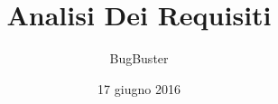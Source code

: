 



\title{\textbf{Analisi Dei Requisiti}}
\author{BugBuster}

\date{17 giugno 2016}




\makeFrontPage

\tableofcontents
\listoffigures
\listoftables





